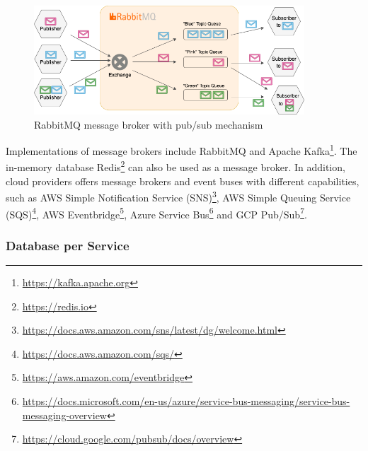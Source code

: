 \documentclass{Configuration_Files/PoliMi3i_thesis}
\begin{document}
\begin{figure}[H]
    \centering
    \includegraphics[width=0.9\textwidth]{myImages/asynch_messaging.png}
    \caption{RabbitMQ message broker with pub/sub mechanism}
    \label{fig:rabbitmq}
\end{figure}

Implementations of message brokers include RabbitMQ and Apache Kafka\footnote{\href{https://kafka.apache.org}{https://kafka.apache.org}}.
The in-memory database Redis\footnote{\href{https://redis.io}{https://redis.io}} can also be used as a message broker.
In addition, cloud providers offers message brokers and event buses with different capabilities, such as AWS Simple Notification Service (SNS)\footnote{\href{https://docs.aws.amazon.com/sns/latest/dg/welcome.html}{https://docs.aws.amazon.com/sns/latest/dg/welcome.html}}, AWS Simple Queuing Service (SQS)\footnote{\href{https://docs.aws.amazon.com/sqs/}{https://docs.aws.amazon.com/sqs/}}, AWS Eventbridge\footnote{\href{https://aws.amazon.com/eventbridge}{https://aws.amazon.com/eventbridge}}, Azure Service Bus\footnote{\href{https://docs.microsoft.com/en-us/azure/service-bus-messaging/service-bus-messaging-overview}{https://docs.microsoft.com/en-us/azure/service-bus-messaging/service-bus-messaging-overview}} and GCP Pub/Sub\footnote{\href{https://cloud.google.com/pubsub/docs/overview}{https://cloud.google.com/pubsub/docs/overview}}.

\subsubsection{Database per Service}
\label{subsubsec:dps}
\end{document}
